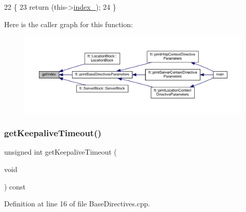 \begin{DoxyCode}
22     \{
23         \textcolor{keywordflow}{return} (this->\hyperlink{classft_1_1_base_directives_a6ba30626837f300201cd32c35d50aa49}{index\_});
24     \}
\end{DoxyCode}
Here is the caller graph for this function\+:
\nopagebreak
\begin{figure}[H]
\begin{center}
\leavevmode
\includegraphics[width=350pt]{classft_1_1_base_directives_a018f34a5ffd66e891494b5c0ee69177b_icgraph}
\end{center}
\end{figure}
\mbox{\label{classft_1_1_base_directives_ab8574338758f65325cab5d1c394826c8}} 
\subsubsection{\texorpdfstring{get\+Keepalive\+Timeout()}{getKeepaliveTimeout()}}
{\footnotesize\ttfamily unsigned int get\+Keepalive\+Timeout (\begin{DoxyParamCaption}\item[{void}]{ }\end{DoxyParamCaption}) const\hspace{0.3cm}{\ttfamily [inherited]}}



Definition at line 16 of file Base\+Directives.\+cpp.



